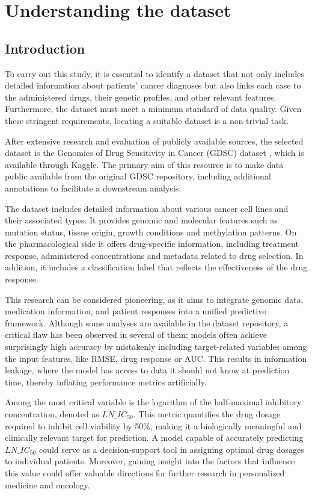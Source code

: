 \chapter{Understanding the dataset}\label{cap:analisis}


\section{Introduction}

To carry out this study, it is essential to identify a dataset that not only includes detailed information about patients' cancer diagnoses but also links each case to the administered drugs, their genetic profiles, and other relevant features. Furthermore, the dataset must meet a minimum standard of data quality. Given these stringent requirements, locating a suitable dataset is a non-trivial task.

After extensive research and evaluation of publicly available sources, the selected dataset is the Genomics of Drug Sensitivity in Cancer (GDSC) dataset \cite{gdsc_kaggle}, which is available through Kaggle. The primary aim of this resource is to make data public available from the original GDSC repository, including additional annotations to facilitate a downstream analysis.

The dataset includes detailed information about various cancer cell lines and their associated types. It provides genomic and molecular features such as mutation status, tissue origin, growth conditions and methylation patterns. On the pharmacological side it offers drug-specific information, including treatment response, administered concentrations and metadata related to drug selection. In addition, it includes a classification label that reflects the effectiveness of the drug response.

This research can be considered pioneering, as it aims to integrate genomic data, medication information, and patient responses into a unified predictive framework. Although some analyses are available in the dataset repository, a critical flaw has been observed in several of them: models often achieve surprisingly high accuracy by mistakenly including target-related variables among the input features, like RMSE, drug response or AUC. This results in information leakage, where the model has access to data it should not know at prediction time, thereby inflating performance metrics artificially.

Among the most critical variable is the logarithm of the half-maximal inhibitory concentration, denoted as \(LN\_IC_{50}\). This metric quantifies the drug dosage required to inhibit cell viability by 50\%, making it a biologically meaningful and clinically relevant target for prediction. A model capable of accurately predicting \(LN\_IC_{50}\) could serve as a decision-support tool in assigning optimal drug dosages to individual patients. Moreover, gaining insight into the factors that influence this value could offer valuable directions for further research in personalized medicine and oncology.

